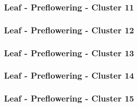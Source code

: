 \clearpage

\subsubsection{Leaf - Preflowering - Cluster 11}

\vspace{1em}



\clearpage

\subsubsection{Leaf - Preflowering - Cluster 12}

\vspace{1em}



\clearpage

\subsubsection{Leaf - Preflowering - Cluster 13}

\vspace{1em}



\clearpage

\subsubsection{Leaf - Preflowering - Cluster 14}

\vspace{1em}



\clearpage

\subsubsection{Leaf - Preflowering - Cluster 15}

\vspace{1em}



\clearpage


